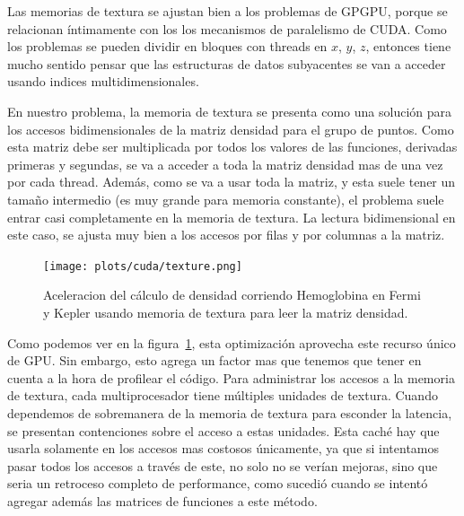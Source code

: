 Las memorias de textura se ajustan bien a los problemas de GPGPU, porque se relacionan
\'intimamente con los los mecanismos de paralelismo de CUDA. Como los problemas se pueden
dividir en bloques con threads en $x$, $y$, $z$, entonces tiene mucho sentido pensar
que las estructuras de datos subyacentes se van a acceder usando indices multidimensionales.

En nuestro problema, la memoria de textura se presenta como una soluci\'on para
los accesos bidimensionales de la matriz densidad para el grupo de puntos.
Como esta matriz debe ser multiplicada por todos los valores de las funciones,
derivadas primeras y segundas, se va a acceder a toda la matriz densidad mas de
una vez por cada thread. Adem\'as, como se va a usar toda la matriz, y esta suele
tener un tama\~no intermedio (es muy grande para memoria constante), el problema
suele entrar casi completamente en la memoria de textura.
La lectura bidimensional en este caso, se ajusta muy bien a los accesos por filas
y por columnas a la matriz.

\begin{figure}[htbp]
   \centering
   \texttt{[image: plots/cuda/texture.png]}
   \caption{Aceleracion del c\'alculo de densidad corriendo Hemoglobina en Fermi y Kepler
   usando memoria de textura para leer la matriz densidad.}
   \label{fig:texture}
\end{figure}

Como podemos ver en la figura~\ref{fig:texture}, esta optimizaci\'on aprovecha este
recurso \'unico de GPU. Sin embargo, esto agrega un factor mas que tenemos que tener en
cuenta a la hora de profilear el c\'odigo. Para administrar los accesos a
la memoria de textura, cada multiprocesador tiene m\'ultiples unidades de textura.
Cuando dependemos de sobremanera de la memoria de textura para esconder la latencia,
se presentan contenciones sobre el acceso a estas unidades. Esta cach\'e hay que usarla
solamente en los accesos mas costosos \'unicamente, ya que si intentamos pasar todos
los accesos a trav\'es de este, no solo no se ver\'ian mejoras, sino que seria un retroceso
completo de performance, como sucedi\'o cuando se intent\'o agregar adem\'as las matrices
de funciones a este m\'etodo.


